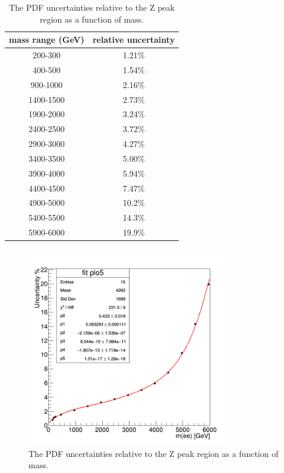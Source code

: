 \begin{table}[t]
\begin{center}
\smallskip\noindent
\begin{tabular}{|c|c|} \hline
mass range (GeV) & relative uncertainty \\\hline
 200-300 & 1.21\% \\
 400-500 & 1.54\% \\
900-1000 & 2.16\% \\
1400-1500 & 2.73\% \\
1900-2000 & 3.24\% \\
2400-2500 & 3.72\% \\
2900-3000 & 4.27\% \\
3400-3500 & 5.00\% \\
3900-4000 & 5.94\% \\
4400-4500 & 7.47\% \\
4900-5000 & 10.2\% \\
5400-5500 & 14.3\% \\
5900-6000 & 19.9\% \\\hline
\end{tabular}%
\caption{The PDF uncertainties relative to the Z peak region as a function of mass.
}
\label{bkg:tab:pdfUncert}
\end{center}
\end{table}

\begin{figure}[bh]
\begin{center}
\includegraphics[angle=0,width=0.8\textwidth]{figures/Zprime/2016/pdf_uncert_relative.png}
\end{center}
\caption{
The PDF uncertainties relative to the Z peak region as a function of mass.
}
\label{fig:pdf_rel_uncert}
\end{figure}



\clearpage
